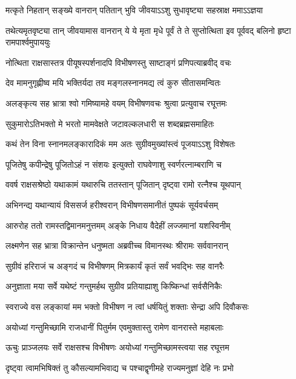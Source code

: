 \twolineshloka
{मत्कृते निहतान् सङ्ख्ये वानरान् पतितान् भुवि}
{जीवयाऽऽशु सुधावृष्ट्या सहस्राक्ष ममाऽऽज्ञया} %

\threelineshloka
{तथेत्यमृतवृष्ट्या तान् जीवयामास वानरान्}
{ये ये मृता मृधे पूर्वं ते ते सुप्तोत्थिता इव}
{पूर्ववद् बलिनो हृष्टा रामपार्श्वमुपाययुः} %

\twolineshloka
{नोत्थिता राक्षसास्तत्र पीयूषस्पर्शनादपि}
{विभीषणस्तु साष्टाङ्गं प्रणिपत्याब्रवीद् वचः} %

\twolineshloka
{देव मामनुगृह्णीष्व मयि भक्तिर्यदा तव}
{मङ्गलस्नानमद्य त्वं कुरु सीतासमन्वितः} %

\twolineshloka
{अलङ्कृत्य सह भ्रात्रा श्वो गमिष्यामहे वयम्}
{विभीषणवचः श्रुत्वा प्रत्युवाच रघूत्तमः} %

\twolineshloka
{सुकुमारोऽतिभक्तो मे भरतो मामवेक्षते}
{जटावल्कलधारी स शब्दब्रह्मसमाहितः} %

\twolineshloka
{कथं तेन विना स्नानमलङ्कारादिकं मम}
{अतः सुग्रीवमुख्यांस्त्वं पूजयाऽऽशु विशेषतः} %

\twolineshloka
{पूजितेषु कपीन्द्रेषु पूजितोऽहं न संशयः}
{इत्युक्तो राघवेणाशु स्वर्णरत्नाम्बराणि च} %

\twolineshloka
{ववर्ष राक्षसश्रेष्ठो यथाकामं यथारुचि}
{ततस्तान् पूजितान् दृष्ट्वा रामो रत्नैश्च यूथपान्} %

\twolineshloka
{अभिनन्द्य यथान्यायं विससर्ज हरीश्वरान्}
{विभीषणसमानीतं पुष्पकं सूर्यवर्चसम्} %

\twolineshloka
{आरुरोह ततो रामस्तद्विमानमनुत्तमम्}
{अङ्के निधाय वैदेहीं लज्जमानां यशस्विनीम्} %

\twolineshloka
{लक्ष्मणेन सह भ्रात्रा विक्रान्तेन धनुष्मता}
{अब्रवीच्च विमानस्थः श्रीरामः सर्ववानरान्} %

\twolineshloka
{सुग्रीवं हरिराजं च अङ्गदं च विभीषणम्}
{मित्रकार्यं कृतं सर्वं भवद्भिः सह वानरैः} %

\twolineshloka
{अनुज्ञाता मया सर्वे यथेष्टं गन्तुमर्हथ}
{सुग्रीव प्रतियाह्याशु किष्किन्धां सर्वसैनिकैः} %

\twolineshloka
{स्वराज्ये वस लङ्कायां मम भक्तो विभीषण}
{न त्वां धर्षयितुं शक्ताः सेन्द्रा अपि दिवौकसः} %

\twolineshloka
{अयोध्यां गन्तुमिच्छामि राजधानीं पितुर्मम}
{एवमुक्तास्तु रामेण वानरास्ते महाबलाः} %

\twolineshloka
{ऊचुः प्राञ्जलयः सर्वे राक्षसश्च विभीषणः}
{अयोध्यां गन्तुमिच्छामस्त्वया सह रघूत्तम} %

\twolineshloka
{दृष्ट्वा त्वामभिषिक्तं तु कौसल्यामभिवाद्य च}
{पश्चाद्वृणीमहे राज्यमनुज्ञां देहि नः प्रभो} %

